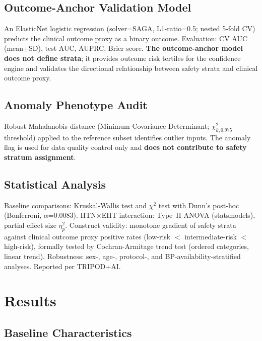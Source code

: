 \documentclass[12pt, a4paper]{article}
\begin{document}
\subsection{Outcome-Anchor Validation Model}

An ElasticNet logistic regression (solver=SAGA, L1-ratio=0.5; nested 5-fold CV)
predicts the clinical outcome proxy as a binary outcome. Evaluation: CV AUC
(mean$\pm$SD), test AUC, AUPRC, Brier score. \textbf{The outcome-anchor model
does not define strata}; it provides outcome risk tertiles for the confidence engine
and validates the directional relationship between safety strata and clinical outcome proxy.

\subsection{Anomaly Phenotype Audit}

Robust Mahalanobis distance\cite{Mahalanobis1936} (Minimum Covariance Determinant;
$\chi^2_{k,0.975}$ threshold) applied to the reference subset identifies outlier
inputs. The anomaly flag is used for data quality control only and \textbf{does
not contribute to safety stratum assignment}.

\subsection{Statistical Analysis}

Baseline comparisons: Kruskal-Wallis test and $\chi^2$ test with Dunn's post-hoc
(Bonferroni, $\alpha$=0.0083). HTN$\times$EHT interaction: Type~II ANOVA
(statsmodels), partial effect size $\eta^2_p$\cite{Cohen1988}.
Construct validity: monotone gradient of safety strata against clinical outcome
proxy positive rates (low-risk $<$ intermediate-risk $<$ high-risk), formally tested
by Cochran-Armitage trend test (ordered categories, linear trend).
Robustness: sex-, age-, protocol-, and BP-availability-stratified analyses.
Reported per TRIPOD+AI\cite{TRIPODAI2024}.

\section{Results}

\subsection{Baseline Characteristics}
\end{document}
